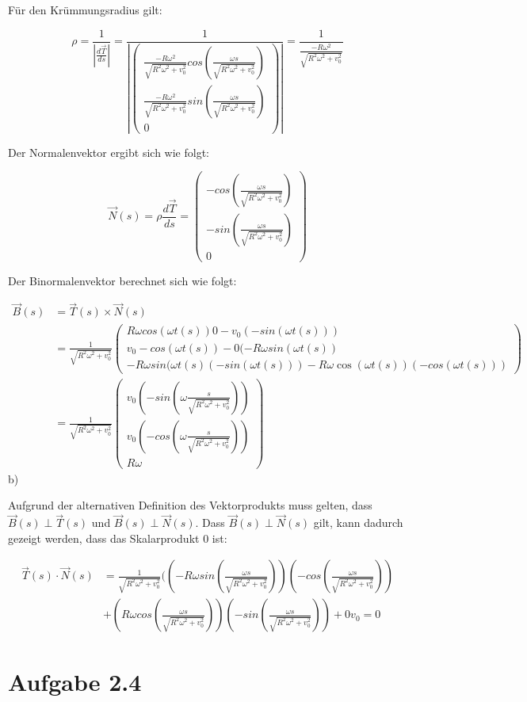 \documentclass{theozettel}
\begin{document}
Für den Krümmungsradius gilt:

$$
\rho = \frac{1}{|\frac{d\vec{T}}{ds}|} = \frac{1}{|\begin{pmatrix}
\frac{- R \omega^{2}}{\sqrt{R^{2} \omega^{2} + v_0^{2}}}cos(\frac{\omega s}{\sqrt{R^{2} \omega^{2} + v_0^{2}}}) \\
\frac{- R \omega^{2}}{\sqrt{R^{2} \omega^{2} + v_0^{2}}}sin(\frac{\omega s}{\sqrt{R^{2} \omega^{2} + v_0^{2}}}) \\
0
\end{pmatrix} |} = \frac{1}{\frac{- R \omega^{2}}{\sqrt{R^{2} \omega^{2} + v_0^{2}}}}
$$

Der Normalenvektor ergibt sich wie folgt:

$$
\vec{N}(s) = \rho \frac{d\vec{T}}{ds} =\begin{pmatrix}
-cos(\frac{\omega s}{\sqrt{R^{2} \omega^{2} + v_0^{2}}}) \\
-sin(\frac{\omega s}{\sqrt{R^{2} \omega^{2} + v_0^{2}}}) \\
0
\end{pmatrix} 
$$

Der Binormalenvektor berechnet sich wie folgt:

\begin{align}
\vec{B}(s) &= \vec{T}(s) \times \vec{N}(s) \\&= \frac{1}{\sqrt{R^{2} \omega^{2} + v_0^{2}}} \begin{pmatrix}
R \omega cos(\omega t(s)) 0 - v_0 (-sin(\omega t(s))) \\
v_0 -cos(\omega t(s)) - 0 (-R \omega sin(\omega t(s)) \\
-R \omega sin(\omega t(s) (-sin(\omega t(s)))  - R \omega \cos(\omega t(s)) (-cos(\omega t(s)))
\end{pmatrix} \\ &= \frac{1}{\sqrt{R^{2} \omega^{2} + v_0^{2}}} \begin{pmatrix}
v_0 (-sin(\omega \frac{s}{\sqrt{R^{2} \omega^{2} + v_0^{2}}})) \\
v_0 (-cos(\omega \frac{s}{\sqrt{R^{2} \omega^{2} + v_0^{2}}})) \\
R \omega
\end{pmatrix}
\end{align}
b)

Aufgrund der alternativen Definition des Vektorprodukts muss gelten, dass $\vec{B}(s) \perp \vec{T}(s)$ und $\vec{B}(s) \perp \vec{N}(s)$. Dass $\vec{B}(s) \perp \vec{N}(s)$ gilt, kann dadurch gezeigt werden, dass das Skalarprodukt $0$ ist:

\begin{align}
\vec{T}(s) \cdot \vec{N}(s) &= \frac{1}{\sqrt{R^{2} \omega^{2} + v_0^{2}}}
((- R \omega sin(\frac{\omega s}{\sqrt{R^{2} \omega^{2} + v_0^{2}}})) (-cos(\frac{\omega s}{\sqrt{R^{2} \omega^{2} + v_0^{2}}})) \\&+ (R \omega cos(\frac{\omega s}{\sqrt{R^{2} \omega^{2} + v_0^2}})) (-sin(\frac{\omega s}{\sqrt{R^{2} \omega^{2}
+ v_0^{2}}})) + 0 v_0 = 0
\end{align}




\newpage
\section{Aufgabe 2.4}
\end{document}
